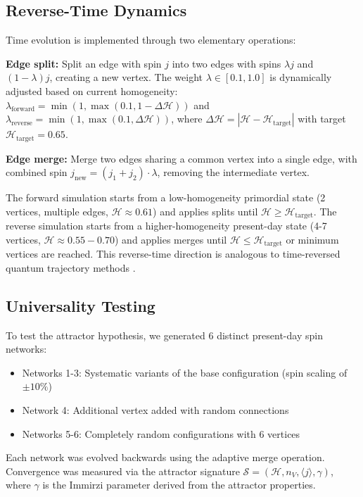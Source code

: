 \documentclass[twocolumn,aps,prd,showpacs,preprintnumbers,longbibliography]{revtex4-2}
\begin{document}
	\subsection{Reverse-Time Dynamics}
	
	Time evolution is implemented through two elementary operations:
	
	\textbf{Edge split:} Split an edge with spin $j$ into two edges with spins $\lambda j$ and $(1-\lambda)j$, creating a new vertex. The weight $\lambda \in [0.1, 1.0]$ is dynamically adjusted based on current homogeneity: $\lambda_{\text{forward}} = \min(1, \max(0.1, 1 - \Delta\mathcal{H}))$ and $\lambda_{\text{reverse}} = \min(1, \max(0.1, \Delta\mathcal{H}))$, where $\Delta\mathcal{H} = |\mathcal{H} - \mathcal{H}_{\text{target}}|$ with target $\mathcal{H}_{\text{target}} = 0.65$.
	
	\textbf{Edge merge:} Merge two edges sharing a common vertex into a single edge, with combined spin $j_{\text{new}} = (j_1 + j_2) \cdot \lambda$, removing the intermediate vertex.
	
	The forward simulation starts from a low-homogeneity primordial state (2 vertices, multiple edges, $\mathcal{H} \approx 0.61$) and applies splits until $\mathcal{H} \ge \mathcal{H}_{\text{target}}$. The reverse simulation starts from a higher-homogeneity present-day state (4-7 vertices, $\mathcal{H} \approx 0.55-0.70$) and applies merges until $\mathcal{H} \le \mathcal{H}_{\text{target}}$ or minimum vertices are reached. This reverse-time direction is analogous to time-reversed quantum trajectory methods \cite{Dressel2017, Hu2023}.
	
	\subsection{Universality Testing}
	
	To test the attractor hypothesis, we generated 6 distinct present-day spin networks:
	\begin{itemize}
		\item Networks 1-3: Systematic variants of the base configuration (spin scaling of $\pm 10\%$)
		\item Network 4: Additional vertex added with random connections
		\item Networks 5-6: Completely random configurations with 6 vertices
	\end{itemize}
	
	Each network was evolved backwards using the adaptive merge operation. Convergence was measured via the attractor signature $\mathcal{S} = (\mathcal{H}, n_V, \langle j \rangle, \gamma)$, where $\gamma$ is the Immirzi parameter \cite{Immirzi1997, Domagala2004, Meissner2004} derived from the attractor properties.
	
\end{document}
